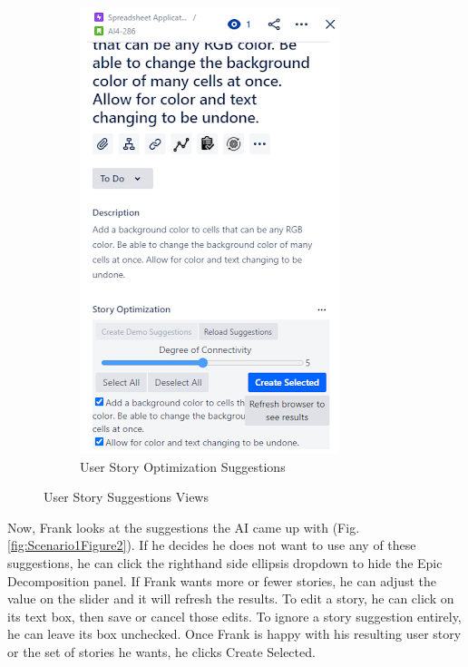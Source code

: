 \begin{figure}[ht]
\begin{subfigure}{.5\textwidth}
\includegraphics[width=.8\linewidth,keepaspectratio]{./figure/Scenario1Figure3.png}
\caption{User Story Optimization Suggestions}
\label{fig:Scenario1Figure3}
\end{subfigure}
\caption{User Story Suggestions Views}
\end{figure}

Now, Frank looks at the suggestions the AI came up with (Fig. \ref{fig:Scenario1Figure2}). If he decides he does not want to use any of these suggestions, he can click the righthand side ellipsis dropdown to hide the Epic Decomposition panel. If Frank wants more or fewer stories, he can adjust the value on the slider and it will refresh the results. To edit a story, he can click on its text box, then save or cancel those edits. To ignore a story suggestion entirely, he can leave its box unchecked. Once Frank is happy with his resulting user story or the set of stories he wants, he clicks Create Selected. 

